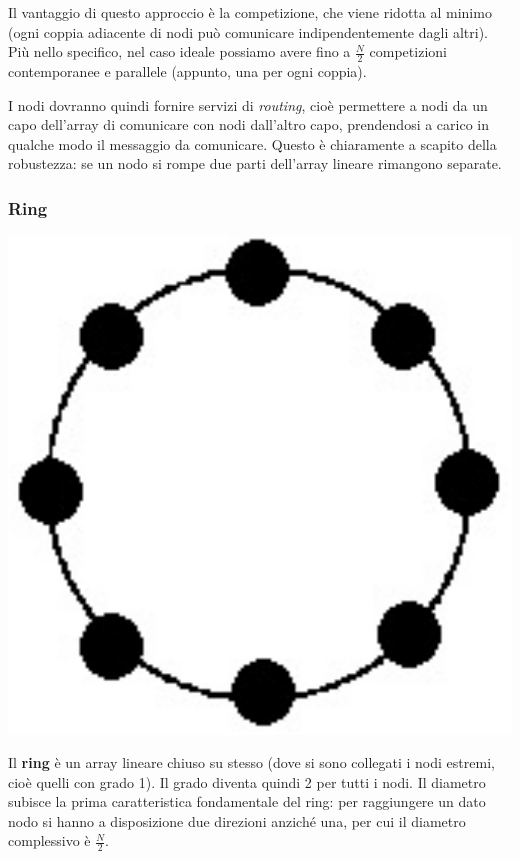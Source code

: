 \documentclass[a4paper,11pt]{article}
\begin{document}
Il vantaggio di questo approccio è la competizione, che viene ridotta al minimo (ogni coppia adiacente di nodi può comunicare indipendentemente dagli altri). Più nello specifico, nel caso ideale possiamo avere fino a $\frac{N}{2}$ competizioni contemporanee e parallele (appunto, una per ogni coppia).

I nodi dovranno quindi fornire servizi di \textit{routing}, cioè permettere a nodi da un capo dell'array di comunicare con nodi dall'altro capo, prendendosi a carico in qualche modo il messaggio da comunicare.
Questo è chiaramente a scapito della robustezza: se un nodo si rompe due parti dell'array lineare rimangono separate.

\subsubsection{Ring}
\begin{center}
	\includegraphics[scale=0.11]{../figures/ring.png}
\end{center}
Il \textbf{ring} è un array lineare chiuso su stesso (dove si sono collegati i nodi estremi, cioè quelli con grado 1). Il grado diventa quindi 2 per tutti i nodi. 
Il diametro subisce la prima caratteristica fondamentale del ring: per raggiungere un dato nodo si hanno a disposizione due direzioni anziché una, per cui il diametro complessivo è $\frac{N}{2}$.
\end{document}
